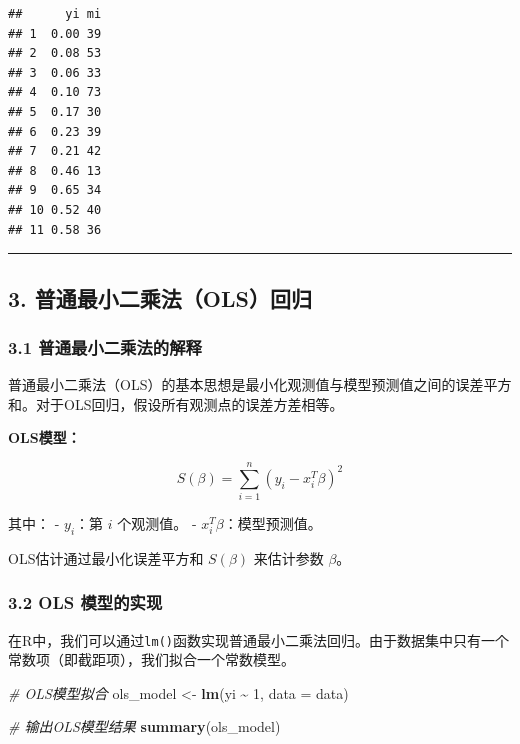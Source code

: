\documentclass[
  10pt,
]{ctexart}
\newenvironment{Shaded}{\begin{snugshade}}{\end{snugshade}}
\newcommand{\AttributeTok}[1]{\textcolor[rgb]{0.13,0.29,0.53}{#1}}
\newcommand{\CommentTok}[1]{\textcolor[rgb]{0.56,0.35,0.01}{\textit{#1}}}
\newcommand{\DecValTok}[1]{\textcolor[rgb]{0.00,0.00,0.81}{#1}}
\newcommand{\FunctionTok}[1]{\textcolor[rgb]{0.13,0.29,0.53}{\textbf{#1}}}
\newcommand{\NormalTok}[1]{#1}
\newcommand{\OtherTok}[1]{\textcolor[rgb]{0.56,0.35,0.01}{#1}}
\newcommand{\SpecialCharTok}[1]{\textcolor[rgb]{0.81,0.36,0.00}{\textbf{#1}}}
\begin{document}
\begin{verbatim}
##      yi mi
## 1  0.00 39
## 2  0.08 53
## 3  0.06 33
## 4  0.10 73
## 5  0.17 30
## 6  0.23 39
## 7  0.21 42
## 8  0.46 13
## 9  0.65 34
## 10 0.52 40
## 11 0.58 36
\end{verbatim}

\begin{center}\rule{0.5\linewidth}{0.5pt}\end{center}

\hypertarget{ux666eux901aux6700ux5c0fux4e8cux4e58ux6cd5olsux56deux5f52}{%
\subsection{3.
普通最小二乘法（OLS）回归}\label{ux666eux901aux6700ux5c0fux4e8cux4e58ux6cd5olsux56deux5f52}}

\hypertarget{ux666eux901aux6700ux5c0fux4e8cux4e58ux6cd5ux7684ux89e3ux91ca}{%
\subsubsection{3.1
普通最小二乘法的解释}\label{ux666eux901aux6700ux5c0fux4e8cux4e58ux6cd5ux7684ux89e3ux91ca}}

普通最小二乘法（OLS）的基本思想是最小化观测值与模型预测值之间的误差平方和。对于OLS回归，假设所有观测点的误差方差相等。

\textbf{OLS模型：}

\[
S(\beta) = \sum_{i=1}^{n} (y_i - x_i^T \beta)^2
\]

其中： - \(y_i\)：第 \(i\) 个观测值。 - \(x_i^T \beta\)：模型预测值。

OLS估计通过最小化误差平方和 \(S(\beta)\) 来估计参数 \(\beta\)。

\hypertarget{ols-ux6a21ux578bux7684ux5b9eux73b0}{%
\subsubsection{3.2 OLS
模型的实现}\label{ols-ux6a21ux578bux7684ux5b9eux73b0}}

在R中，我们可以通过\texttt{lm()}函数实现普通最小二乘法回归。由于数据集中只有一个常数项（即截距项），我们拟合一个常数模型。

\begin{Shaded}
\begin{Highlighting}[]
\CommentTok{\# OLS模型拟合}
\NormalTok{ols\_model }\OtherTok{\textless{}{-}} \FunctionTok{lm}\NormalTok{(yi }\SpecialCharTok{\textasciitilde{}} \DecValTok{1}\NormalTok{, }\AttributeTok{data =}\NormalTok{ data)}

\CommentTok{\# 输出OLS模型结果}
\FunctionTok{summary}\NormalTok{(ols\_model)}
\end{Highlighting}
\end{Shaded}
\end{document}
